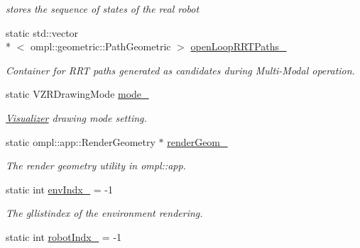 \begin{DoxyCompactItemize}
\begin{DoxyCompactList}\small\item\em stores the sequence of states of the real robot \end{DoxyCompactList}\item 
\hypertarget{class_visualizer_a11d99288fa2898f177676f7f40ab52de}{static std\-::vector\\*
$<$ ompl\-::geometric\-::\-Path\-Geometric $>$ \hyperlink{class_visualizer_a11d99288fa2898f177676f7f40ab52de}{open\-Loop\-R\-R\-T\-Paths\-\_\-}}\label{class_visualizer_a11d99288fa2898f177676f7f40ab52de}

\begin{DoxyCompactList}\small\item\em Container for R\-R\-T paths generated as candidates during Multi-\/\-Modal operation. \end{DoxyCompactList}\item 
\hypertarget{class_visualizer_aa43c5908a3ae82a79c06d126fb32b505}{static V\-Z\-R\-Drawing\-Mode \hyperlink{class_visualizer_aa43c5908a3ae82a79c06d126fb32b505}{mode\-\_\-}}\label{class_visualizer_aa43c5908a3ae82a79c06d126fb32b505}

\begin{DoxyCompactList}\small\item\em \hyperlink{class_visualizer}{Visualizer} drawing mode setting. \end{DoxyCompactList}\item 
\hypertarget{class_visualizer_a4d2cb9a7c08bca45465b3c19b89ec3e1}{static ompl\-::app\-::\-Render\-Geometry $\ast$ \hyperlink{class_visualizer_a4d2cb9a7c08bca45465b3c19b89ec3e1}{render\-Geom\-\_\-}}\label{class_visualizer_a4d2cb9a7c08bca45465b3c19b89ec3e1}

\begin{DoxyCompactList}\small\item\em The render geometry utility in ompl\-::app. \end{DoxyCompactList}\item 
\hypertarget{class_visualizer_a6374971a2ec9b9802e85f227e1fc02a8}{static int \hyperlink{class_visualizer_a6374971a2ec9b9802e85f227e1fc02a8}{env\-Indx\-\_\-} = -\/1}\label{class_visualizer_a6374971a2ec9b9802e85f227e1fc02a8}

\begin{DoxyCompactList}\small\item\em The gllistindex of the environment rendering. \end{DoxyCompactList}\item 
\hypertarget{class_visualizer_a314590f6cbcd1e3d0f47567dd4ced147}{static int \hyperlink{class_visualizer_a314590f6cbcd1e3d0f47567dd4ced147}{robot\-Indx\-\_\-} = -\/1}\label{class_visualizer_a314590f6cbcd1e3d0f47567dd4ced147}


\end{DoxyCompactItemize}
